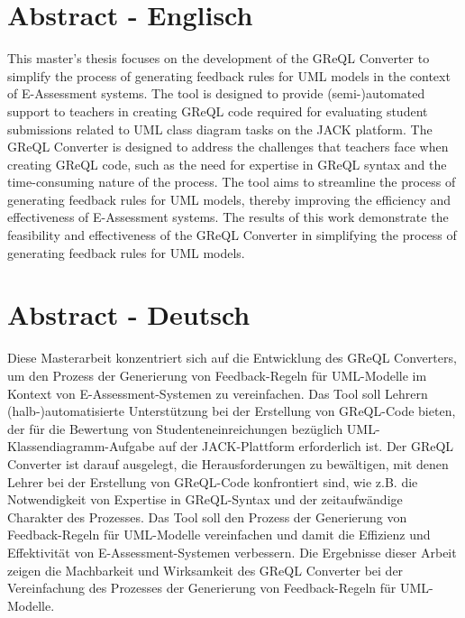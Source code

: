 \chapter*{Abstract - Englisch}

This master's thesis focuses on the development of the GReQL Converter to simplify the process of generating feedback
rules for UML models in the context of E-Assessment systems. The tool is designed to provide (semi-)automated support to
teachers in creating GReQL code required for evaluating student submissions related to UML class diagram tasks on the
JACK platform. The GReQL Converter is designed to address the challenges that teachers face when creating GReQL code,
such as the need for expertise in GReQL syntax and the time-consuming nature of the process. The tool aims to streamline
the process of generating feedback rules for UML models, thereby improving the efficiency and effectiveness of
E-Assessment systems. The results of this work demonstrate the feasibility and effectiveness of the GReQL Converter
in simplifying the process of generating feedback rules for UML models.


\chapter*{Abstract - Deutsch}
Diese Masterarbeit konzentriert sich auf die Entwicklung des GReQL Converters, um den Prozess der Generierung
von Feedback-Regeln für UML-Modelle im Kontext von E-Assessment-Systemen zu vereinfachen. Das Tool soll Lehrern
(halb-)automatisierte Unterstützung bei der Erstellung von GReQL-Code bieten, der für die Bewertung von
Studenteneinreichungen bezüglich UML-Klassendiagramm-Aufgabe auf der JACK-Plattform erforderlich ist.
Der GReQL Converter ist darauf ausgelegt, die Herausforderungen zu bewältigen, mit denen Lehrer bei der
Erstellung von GReQL-Code konfrontiert sind, wie z.B. die Notwendigkeit von Expertise in GReQL-Syntax und der
zeitaufwändige Charakter des Prozesses. Das Tool soll den Prozess der Generierung von Feedback-Regeln für
UML-Modelle vereinfachen und damit die Effizienz und Effektivität von E-Assessment-Systemen verbessern. Die Ergebnisse
dieser Arbeit zeigen die Machbarkeit und Wirksamkeit des GReQL Converter bei der Vereinfachung des Prozesses der
Generierung von Feedback-Regeln für UML-Modelle.

